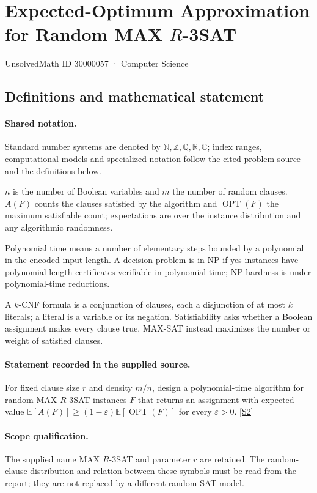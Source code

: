 \documentclass[11pt]{article}
\newcommand{\sref}[2]{\hyperlink{source:#1:#2}{[S#2]}}
\begin{document}
\setcounter{section}{30000056}
\section{Expected-Optimum Approximation for Random MAX $R$-3SAT}\label{30000057}
{\small\sffamily UnsolvedMath ID 30000057 · Computer Science}
\subsection{Definitions and mathematical statement}

\paragraph{Shared notation.}Standard number systems are denoted by $\mathbb N,\mathbb Z,\mathbb Q,\mathbb R,\mathbb C$; index ranges, computational models and specialized notation follow the cited problem source and the definitions below.


$n$ is the number of Boolean variables and $m$ the number of random clauses. $A(F)$ counts the clauses satisfied by the algorithm and $\operatorname{OPT}(F)$ the maximum satisfiable count; expectations are over the instance distribution and any algorithmic randomness.

Polynomial time means a number of elementary steps bounded by a polynomial in the encoded input length. A decision problem is in $\mathrm{NP}$ if yes-instances have polynomial-length certificates verifiable in polynomial time; NP-hardness is under polynomial-time reductions.

A $k$-CNF formula is a conjunction of clauses, each a disjunction of at most $k$ literals; a literal is a variable or its negation. Satisfiability asks whether a Boolean assignment makes every clause true. MAX-SAT instead maximizes the number or weight of satisfied clauses.
\paragraph{Statement recorded in the supplied source.}
For fixed clause size $r$ and density $m/n$, design a polynomial-time algorithm for random MAX $R$-3SAT instances $F$ that returns an assignment with expected value $\mathbb{E}[A(F)]\geq(1-\varepsilon)\mathbb{E}[\operatorname{OPT}(F)]$ for every $\varepsilon>0$. \sref{30000057}{2}
\paragraph{Scope qualification.}
The supplied name MAX $R$-3SAT and parameter $r$ are retained. The random-clause distribution and relation between these symbols must be read from the report; they are not replaced by a different random-SAT model.
\end{document}
